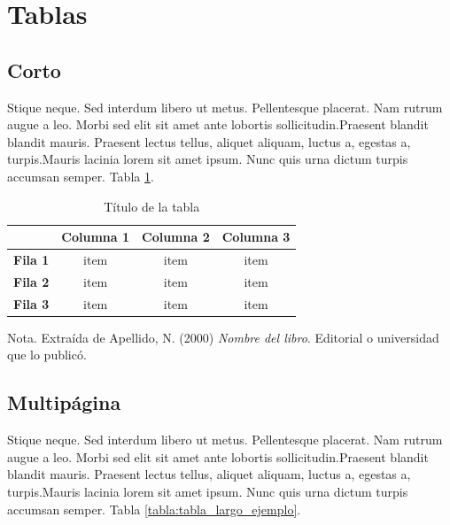 \section{Tablas}

\subsection{Corto}
Stique neque. Sed interdum libero ut metus.
Pellentesque placerat. Nam rutrum augue a leo. Morbi sed 
elit sit amet ante lobortis sollicitudin.Praesent blandit 
blandit mauris. Praesent lectus tellus, aliquet aliquam,
luctus a, egestas a, turpis.Mauris lacinia lorem sit amet
ipsum. Nunc quis urna dictum turpis accumsan semper. Tabla
\ref{tabla:ejemplo}.\\

\begin{table}[H]
    \caption{Título de la tabla}
    \label{tabla:ejemplo}
    \begin{center}
        \begin{tabular}{c|c|c|c|}
            \cline{2-4}
            & \textbf{Columna 1} & \textbf{Columna 2} & \textbf{Columna 3} \\ \hline
            \multicolumn{1}{|c|}{\textbf{Fila 1}} & item               & item               & item               \\ \hline
            \multicolumn{1}{|c|}{\textbf{Fila 2}} & item               & item               & item               \\ \hline
            \multicolumn{1}{|c|}{\textbf{Fila 3}} & item               & item               & item               \\ \hline
        \end{tabular}
    \end{center}
    Nota. Extraída de Apellido, N. (2000) \textit{Nombre del libro}.
    Editorial o universidad que lo publicó.
\end{table}

\subsection{Multipágina}
Stique neque. Sed interdum libero ut metus.
Pellentesque placerat. Nam rutrum augue a leo. Morbi sed 
elit sit amet ante lobortis sollicitudin.Praesent blandit 
blandit mauris. Praesent lectus tellus, aliquet aliquam,
luctus a, egestas a, turpis.Mauris lacinia lorem sit amet
ipsum. Nunc quis urna dictum turpis accumsan semper. Tabla
\ref{tabla:tabla_largo_ejemplo}.\\

